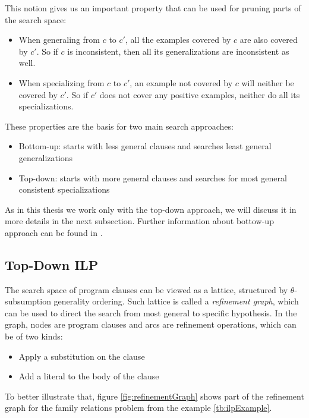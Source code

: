 This notion gives us an important property that can be used for pruning parts of the search space:

\begin{itemize}
 \item When generaling from $c$ to $c'$, all the examples covered by $c$ are also covered by $c'$. So if $c$ is
inconsistent, then all its generalizations are inconsistent as well.
  \item When specializing from $c$ to $c'$, an example not covered by $c$ will neither be covered by $c'$. So if $c'$
does not cover any positive examples, neither do all its specializations.
\end{itemize}

These properties are the basis for two main search approaches:

\begin{itemize}
 \item Bottom-up: starts with less general clauses and searches least general generalizations
 \item Top-down: starts with more general clauses and searches for most general consistent specializations
\end{itemize}

As in this thesis we work only with the top-down approach, we will discuss it in more details in the next subsection.
Further information about bottow-up approach can be found in \cite{DBLP:journals/ml/LavracD96}.

\subsection{Top-Down ILP}

The search space of program clauses can be viewed as a lattice, structured by $\theta$-subsumption generality
ordering. Such lattice is called a \emph{refinement graph}, which can be used to direct the search from most general to
specific hypothesis. In the graph, nodes are program clauses and arcs are refinement operations, which can be of two
kinds:

\begin{itemize}
 \item Apply a substitution on the clause
 \item Add a literal to the body of the clause
\end{itemize}

To better illustrate that, figure \ref{fig:refinementGraph} shows part of the refinement graph for the family
relations problem from the example \ref{tb:ilpExample}.

